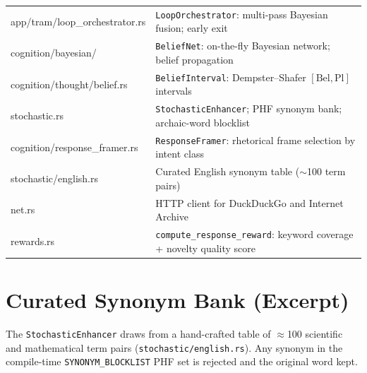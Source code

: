 \documentclass[11pt,a4paper]{article}
\begin{document}
\begin{table}[H]
\begin{tabularx}{\linewidth}{@{}>{\ttfamily\small}p{4.2cm} X@{}}
\rowcolor{white}     app/tram/loop\_orchestrator.rs & \texttt{LoopOrchestrator}: multi-pass Bayesian fusion; early exit \\
\rowcolor{lmmRowAlt} cognition/bayesian/          & \texttt{BeliefNet}: on-the-fly Bayesian network; belief propagation \\
\rowcolor{white}     cognition/thought/belief.rs  & \texttt{BeliefInterval}: Dempster--Shafer $[\mathrm{Bel}, \mathrm{Pl}]$ intervals \\
\rowcolor{lmmRowAlt} stochastic.rs                & \texttt{StochasticEnhancer}; PHF synonym bank; archaic-word blocklist \\
\rowcolor{white}     cognition/response\_framer.rs & \texttt{ResponseFramer}: rhetorical frame selection by intent class \\
\rowcolor{lmmRowAlt} stochastic/english.rs        & Curated English synonym table ($\sim$100 term pairs) \\
\rowcolor{white}     net.rs                       & HTTP client for DuckDuckGo and Internet Archive \\
\rowcolor{lmmRowAlt} rewards.rs                   & \texttt{compute\_response\_reward}: keyword coverage + novelty quality score \\
\bottomrule
\end{tabularx}
\end{table}

\section{Curated Synonym Bank (Excerpt)}
\label{app:synonyms}

The \texttt{StochasticEnhancer} draws from a hand-crafted table of $\approx$100 scientific and
mathematical term pairs (\texttt{stochastic/english.rs}). Any synonym in the compile-time
\texttt{SYNONYM\_BLOCKLIST} PHF set is rejected and the original word kept.
\end{document}
